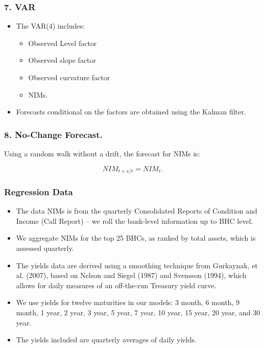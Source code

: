 \documentclass[handout]{beamer}
\begin{document}
\begin{frame}

\frametitle{7. VAR}

\begin{itemize}

\item The VAR(4) includes:\begin{itemize} \item Observed Level factor
\item Observed slope factor
\item Observed curvature factor
\item NIMs.
\end{itemize}

\item Forecasts conditional on the factors are obtained using
the Kalman filter.

\end{itemize}

\end{frame}

\begin{frame}

\frametitle{8. No-Change Forecast.}

Using a random walk without a drift, the forecast for NIMs is:

\begin{equation*}
NIM_{t+s/t}=NIM_{t}.
\end{equation*}

\end{frame}


\begin{frame}

\frametitle{Regression Data}

\begin{itemize}

\item The data NIMs  is from the quarterly Consolidated Reports of Condition and Income (Call Report) -- we roll the bank-level information up to BHC level.

\item We aggregate NIMs for the top 25 BHCs, as ranked by total assets, which is assessed quarterly.

\item The yields data are derived using a smoothing technique from Gurkaynak, et al. (2007), based on Nelson and Siegel (1987) and Svensson (1994), which allows for daily measures of an off-the-run Treasury yield curve.

\item We use yields for twelve maturities in our models: 3 month, 6 month, 9 month, 1 year, 2 year, 3 year, 5 year, 7 year, 10 year, 15 year, 20 year, and 30 year.

\item The yields included are quarterly averages of daily yields.

\end{itemize}

\end{frame}
\end{document}
